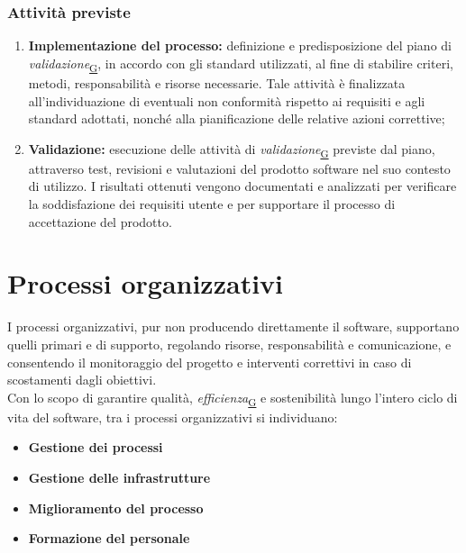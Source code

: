 \documentclass[a4paper,12pt]{article}
\begin{document}
        \subsubsection{Attività previste}
            \begin{enumerate}
                \item \textbf{Implementazione del processo:} definizione e predisposizione del piano di \textit{validazione}\textsubscript{\href{https://atlasteam9.github.io/Atlas/glossario.html\#Validazione}{G}}, in accordo con gli standard utilizzati, al fine di stabilire criteri, metodi, responsabilità e risorse necessarie. Tale attività è finalizzata all'individuazione di eventuali non conformità rispetto ai requisiti e agli standard adottati, nonché alla pianificazione delle relative azioni correttive;
                \item \textbf{Validazione:} esecuzione delle attività di \textit{validazione}\textsubscript{\href{https://atlasteam9.github.io/Atlas/glossario.html\#Validazione}{G}} previste dal piano, attraverso test, revisioni e valutazioni del prodotto software nel suo contesto di utilizzo. I risultati ottenuti vengono documentati e analizzati per verificare la soddisfazione dei requisiti utente e per supportare il processo di accettazione del prodotto.
            \end{enumerate}    

\newpage

\section{Processi organizzativi}
    I processi organizzativi, pur non producendo direttamente il software, supportano quelli primari e di supporto, regolando risorse, responsabilità e comunicazione, e consentendo il monitoraggio del progetto e interventi correttivi in caso di scostamenti dagli obiettivi. \\
    Con lo scopo di garantire qualità, \textit{efficienza}\textsubscript{\href{https://atlasteam9.github.io/Atlas/glossario.html\#Efficienza}{G}} e sostenibilità lungo l'intero ciclo di vita del software, tra i processi organizzativi si individuano:
    \begin{itemize}
        \item \textbf{Gestione dei processi}
        \item \textbf{Gestione delle infrastrutture}
        \item \textbf{Miglioramento del processo}
        \item \textbf{Formazione del personale}
    \end{itemize}
    
\end{document}

